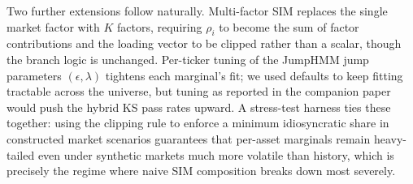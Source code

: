 Two further extensions follow naturally. Multi-factor SIM replaces
the single market factor with $K$ factors, requiring $\rho_i$ to
become the sum of factor contributions and the loading vector to be
clipped rather than a scalar, though the branch logic is unchanged.
Per-ticker tuning of the JumpHMM jump parameters $(\epsilon, \lambda)$
tightens each marginal's fit; we used defaults to keep fitting
tractable across the universe, but tuning as reported in the
companion paper~\cite{alswaidanVarner2026jdiq} would push the hybrid
KS pass rates upward. A
stress-test harness ties these together: using the clipping rule to
enforce a minimum idiosyncratic share in constructed market scenarios
guarantees that per-asset marginals remain heavy-tailed even under
synthetic markets much more volatile than history, which is precisely
the regime where naive SIM composition breaks down most severely.
